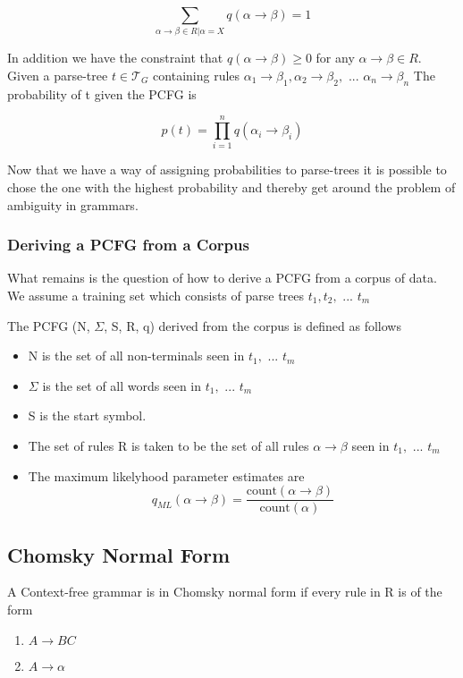 $$\sum_{\alpha \rightarrow \beta \in R|\alpha=X}q(\alpha \rightarrow \beta) = 1$$

In addition we have the constraint that $q(\alpha \rightarrow \beta) \geq 0$ for any $\alpha \rightarrow \beta \in R$.
Given a parse-tree $t \in \mathcal{T}_G$ containing rules $\alpha_1 \rightarrow \beta_1, \alpha_2 \rightarrow \beta_2, \text{ ... } \alpha_n \rightarrow \beta_n$
The probability of t given the PCFG is

$$p(t) = \prod_{i=1}^n q(\alpha_i \rightarrow \beta_i)$$

\cite[p.7-8]{collins}

Now that we have a way of assigning probabilities to parse-trees it is possible to chose the one with the highest probability and thereby get around the
problem of ambiguity in grammars.

\subsubsection{Deriving a PCFG from a Corpus}
What remains is the question of how to derive a PCFG from a corpus of data.
We assume a training set which consists of parse trees $t_1, t_2, \text{ ... } t_m$

The PCFG (N, $\Sigma$, S, R, q) derived from the corpus is defined as follows
\begin{itemize}
\item N is the set of all non-terminals seen in $t_1, \text{ ... } t_m$
\item $\Sigma$ is the set of all words seen in $t_1, \text{ ... } t_m$
\item S is the start symbol.
\item The set of rules R is taken to be the set of all rules $\alpha \rightarrow \beta$ seen in $t_1, \text{ ... } t_m$
\item The maximum likelyhood parameter estimates are 
$$q_{ML}(\alpha \rightarrow \beta) = \frac{\text{count}(\alpha \rightarrow \beta)}{\text{count}(\alpha)}$$
\end{itemize}
\cite[p.9-10]{collins}

\subsection{Chomsky Normal Form}
A Context-free grammar is in Chomsky normal form if every rule in R is of the form
\begin{enumerate}
\item $A \rightarrow BC$
\item $A \rightarrow \alpha$
\end{enumerate}

